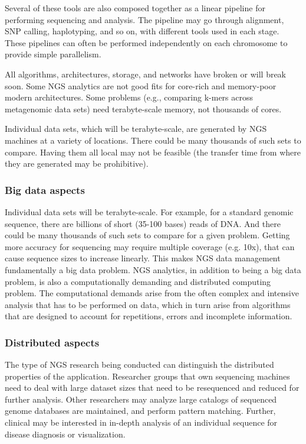 \documentclass[times]{cpeauth}
\begin{document}
Several of these tools are also composed together as a linear pipeline for
performing sequencing and analysis. The pipeline may go through alignment, SNP
calling, haplotyping, and so on, with different tools used in each stage. These
pipelines can often be performed independently on each chromosome to provide
simple parallelism.

All algorithms, architectures, storage, and networks have broken or will break
soon.  Some NGS analytics are not good fits for core-rich and memory-poor modern
architectures. Some problems (e.g., comparing k-mers across metagenomic data
sets) need terabyte-scale memory, not thousands of cores.~\cite{ngs-gap}

Individual data sets, which will be terabyte-scale, are generated by NGS
machines at a variety of locations. There could be many thousands of such sets
to compare. Having them all local may not be feasible (the transfer time from
where they are generated may be prohibitive).

\subsubsection*{Big data aspects}

Individual data sets will be terabyte-scale. For example, for a standard genomic
sequence, there are billions of short (35-100 bases) reads of DNA.  And there
could be many thousands of such sets to compare for a given problem.  Getting
more accuracy for sequencing may require multiple coverage (e.g. 10x), that can
cause sequence sizes to increase linearly.  This makes NGS data management
fundamentally a big data problem.  NGS analytics, in addition to being a big
data problem, is also a computationally demanding and distributed computing
problem.  The computational demands arise from the often complex and intensive
analysis that has to be performed on data, which in turn arise from algorithms
that are designed to account for repetitions, errors and incomplete information.

\subsubsection*{Distributed aspects}

The type of NGS research being conducted can distinguish the distributed
properties of the application. Researcher groups that own sequencing machines
need to deal with large dataset sizes that need to be resequenced and reduced
for further analysis. Other researchers may analyze large catalogs of sequenced
genome databases are maintained, and perform pattern matching. Further, clinical
may be interested in in-depth analysis of an individual sequence for disease
diagnosis or visualization.
\end{document}
